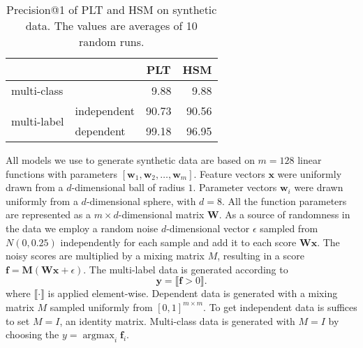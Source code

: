 \documentclass{article}
\renewcommand{\vec}[1]{\boldsymbol{#1}}
\newcommand{\bx}{\vec{x}}
\newcommand{\by}{\vec{y}}
\newcommand{\assert}[1]{\llbracket #1 \rrbracket}
\DeclareMathOperator*{\argmax}{\arg \max}
\begin{document}
{\begin{table}[h]
	\begin{center}
	\caption{Precision@1 of PLT and HSM on synthetic data. The values are averages of 10 random runs.}
	\label{tab:synthetic1}
\begin{tabular}{ll|rr}
	\toprule
	\multicolumn{2}{l|}{}                       & \multicolumn{1}{c}{PLT} & \multicolumn{1}{c}{HSM} \\
	\midrule
	\multicolumn{2}{l|}{multi-class}            & 9.88                    & 9.88                    \\
	\midrule
	\multirow{2}{*}{multi-label} & independent & 90.73                   & 90.56                   \\
	& dependent   & 99.18                   & 96.95                   \\
	\bottomrule
\end{tabular}
\end{center}
\vspace{-0.4cm}
\end{table}



All models we use to generate synthetic data are based on $m = 128$ linear functions 
with parameters $[\boldsymbol{w}_1, \boldsymbol{w}_2, \ldots, \boldsymbol{w}_m]$. Feature vectors $\bx$ were uniformly drawn from a $d$-dimensional ball of radius $1$. Parameter vectors $\boldsymbol{w}_i$ were drawn uniformly from a $d$-dimensional sphere, with $d = 8$. All the function parameters are represented as a $m \times d$-dimensional matrix $\boldsymbol{W}$. 
As a source of randomness in the data we employ a random noise $d$-dimensional vector $\epsilon$ sampled from $N(0, 0.25)$ independently for each sample and add it to each score $\boldsymbol{W}\bx$. The noisy scores are multiplied by a mixing matrix $M$, resulting in a score $\boldsymbol{f} = \boldsymbol{M} (\boldsymbol{W}\bx +  \epsilon ) $.
The multi-label data is generated according to
\begin{equation*}
\by = \assert{\boldsymbol{f} > 0}.
\end{equation*}
where $\assert{\cdot}$ is applied element-wise.
Dependent data is generated with a mixing matrix $M$ sampled uniformly from $[0, 1]^{m \times m}$. To get independent data is suffices to set $M = I$, an identity matrix.
Multi-class data is generated with $M = I$ by choosing the $y = \argmax_{i}{\boldsymbol{f}_{i}}$.

}
\end{document}
